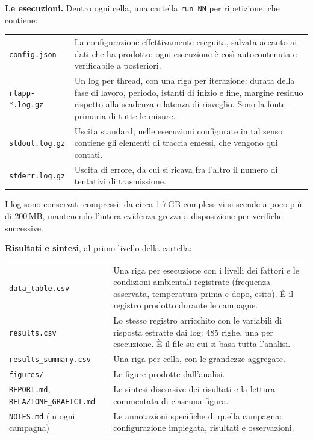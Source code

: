 \textbf{Le esecuzioni.} Dentro ogni cella, una cartella \texttt{run\_NN} per ripetizione, che
contiene:

\begin{center}\small
\begin{tabular}{p{4.3cm}p{10.0cm}}
\toprule
\texttt{config.json} & La configurazione effettivamente eseguita, salvata accanto ai dati che ha
prodotto: ogni esecuzione \`e cos\`i autocontenuta e verificabile a posteriori. \\
\addlinespace
\texttt{rtapp-*.log.gz} & Un log per thread, con una riga per iterazione: durata della fase di
lavoro, periodo, istanti di inizio e fine, margine residuo rispetto alla scadenza e latenza di
risveglio. Sono la fonte primaria di tutte le misure. \\
\addlinespace
\texttt{stdout.log.gz} & Uscita standard; nelle esecuzioni configurate in tal senso contiene gli
elementi di traccia emessi, che vengono qui contati. \\
\addlinespace
\texttt{stderr.log.gz} & Uscita di errore, da cui si ricava fra l'altro il numero di tentativi di
trasmissione. \\
\bottomrule
\end{tabular}
\end{center}

I log sono conservati compressi: da circa 1.7\,GB complessivi si scende a poco pi\`u di 200\,MB,
mantenendo l'intera evidenza grezza a disposizione per verifiche successive.

\textbf{Risultati e sintesi}, al primo livello della cartella:

\begin{center}\small
\begin{tabular}{p{4.3cm}p{10.0cm}}
\toprule
\texttt{data\_table.csv} & Una riga per esecuzione con i livelli dei fattori e le condizioni
ambientali registrate (frequenza osservata, temperatura prima e dopo, esito). \`E il registro
prodotto durante le campagne. \\
\addlinespace
\texttt{results.csv} & Lo stesso registro arricchito con le variabili di risposta estratte dai log:
485 righe, una per esecuzione. \`E il file su cui si basa tutta l'analisi. \\
\addlinespace
\texttt{results\_summary.csv} & Una riga per cella, con le grandezze aggregate. \\
\addlinespace
\texttt{figures/} & Le figure prodotte dall'analisi. \\
\addlinespace
\texttt{REPORT.md}, \texttt{RELAZIONE\_GRAFICI.md} & Le sintesi discorsive dei risultati e la
lettura commentata di ciascuna figura. \\
\addlinespace
\texttt{NOTES.md} (in ogni campagna) & Le annotazioni specifiche di quella campagna: configurazione
impiegata, risultati e osservazioni. \\
\bottomrule
\end{tabular}
\end{center}

